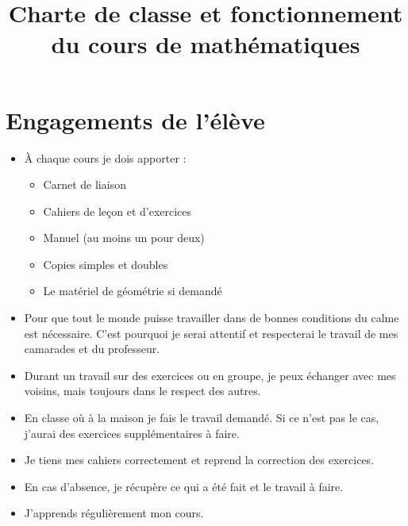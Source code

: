 \documentclass[a4paper, 11pt]{article}
\author{}
\title{Charte de classe et fonctionnement du cours de mathématiques}
\date{}
\begin{document}
\maketitle	
\thispagestyle{empty}

\vspace*{-1cm}
	
\section{Engagements de l'élève}

\begin{itemize}
	
	\item \`A chaque cours je dois apporter :
		\begin{itemize}
			\item Carnet de liaison
			\item Cahiers de leçon et d'exercices
			\item Manuel (au moins un pour deux)
			\item Copies simples et doubles
			\item Le matériel de géométrie si demandé
			
		\end{itemize}
	
	\item Pour que tout le monde puisse travailler dans de bonnes conditions du calme est nécessaire. C'est pourquoi je serai attentif et respecterai le travail de mes camarades et du professeur.
	
	\item Durant un travail sur des exercices ou en groupe, je peux échanger avec mes voisins, mais toujours dans le respect des autres.
	
	\item En classe où à la maison je fais le travail demandé. Si ce n'est pas le cas, j'aurai des exercices supplémentaires à faire.
	
	\item Je tiens mes cahiers correctement et reprend la correction des exercices.
	
	\item En cas d'absence, je récupère ce qui a été fait et le travail à faire.
	
	\item J'apprends régulièrement mon cours. 
\end{itemize}
	
\end{document}
